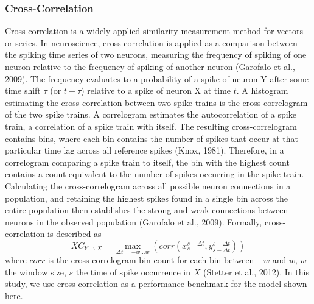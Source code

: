 \documentclass[11pt,titlepage]{article}
\begin{document}
\subsubsection{Cross-Correlation}
Cross-correlation is a widely applied similarity measurement method for vectors or series. In neuroscience, cross-correlation is applied as a comparison between the spiking time series of two neurons, measuring the frequency of spiking of one neuron relative to the frequency of spiking of another neuron (Garofalo et al., 2009). The frequency evaluates to a probability of a spike of neuron Y after some time shift $\tau$ (or $t + \tau$) relative to a spike of neuron X at time $t$. A histogram estimating the cross-correlation between two spike trains is the cross-correlogram of the two spike trains. A correlogram estimates the autocorrelation of a spike train, a correlation of a spike train with itself. The resulting cross-correlogram contains bins, where each bin contains the number of spikes that occur at that particular time lag across all reference spikes (Knox, 1981). Therefore, in a correlogram comparing a spike train to itself, the bin with the highest count contains a count equivalent to the number of spikes occurring in the spike train. Calculating the cross-correlogram across all possible neuron connections in a population, and retaining the highest spikes found in a single bin across the entire population then establishes the strong and weak connections between neurons in the observed population (Garofalo et al., 2009). Formally, cross-correlation is described as
$$XC_{Y \rightarrow X} = \max_{\Delta t = -w ... w} (corr(x_s^{s-\Delta t},y_{s-\Delta t}^{s-\Delta t} ))$$
where $corr$ is the cross-correlogram bin count for each bin between $-w$ and $w$, $w$ the window size, $s$ the time of spike occurrence in $X$ (Stetter et al., 2012). In this study, we use cross-correlation as a performance benchmark for the model shown here.
\end{document}
